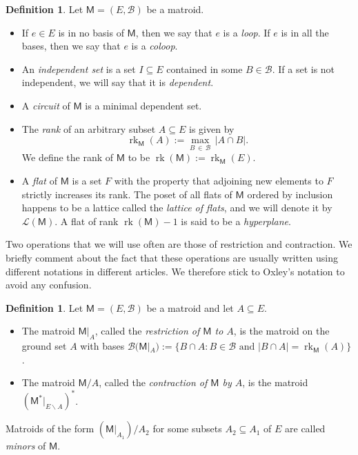 \documentclass[11pt, a4paper, english]{amsart}
\theoremstyle{teoremas}
\theoremstyle{definition}
\newtheorem{definition}[theorem]{Definition}
\DeclareMathOperator{\rk}{rk}
\newcommand{\M}{\mathsf{M}}
\begin{document}
\begin{definition}
    Let $\M=(E,\mathscr{B})$ be a matroid.
    \begin{itemize}
        \item If $e\in E$ is in no basis of $\M$, then we say that $e$ is a \emph{loop}. If $e$ is in all the bases, then we say that $e$ is a \emph{coloop}.
        \item An \emph{independent set} is a set $I\subseteq E$ contained in some $B\in \mathscr{B}$. If a set is not independent, we will say that it is \emph{dependent}.
        \item A \emph{circuit} of $\M$ is a minimal dependent set. 
        \item The \emph{rank} of an arbitrary subset $A\subseteq E$ is given by
            \[ \rk_{\M}(A) := \max_{B\, \in \,\mathscr{B}}\, |A\cap B|.\]
        We define the rank of $\M$ to be $\rk(\M) := \rk_{\M}(E)$.
        \item A \emph{flat} of $\M$ is a set $F$ with the property that adjoining new elements to $F$ strictly increases its rank. The poset of all flats of $\M$ ordered by inclusion happens to be a lattice called the \emph{lattice of flats}, and we will  denote it by $\mathcal{L}(\M)$. A flat of rank $\rk(\M)-1$ is said to be a \emph{hyperplane}.
    \end{itemize}
\end{definition}

Two operations that we will use often are those of restriction and contraction. We briefly comment about the fact that these operations are usually written using different notations in different articles. We therefore stick to Oxley's notation \cite{oxley} to avoid any confusion. 

\begin{definition}
    Let $\M=(E,\mathscr{B})$ be a matroid and let $A\subseteq E$.
    \begin{itemize}
    \item The matroid $\M|_A$, called the \emph{restriction of $\M$ to $A$}, is the matroid on the ground set $A$ with bases $\mathscr{B}(\M|_A) := \{B\cap A: B\in \mathscr{B} \text{ and } |B\cap A| = \rk_{\M}(A)\}$.
    \item The matroid $\M/A$, called the \emph{contraction of $\M$ by $A$}, is the matroid $(\M^*|_{E\smallsetminus A})^*$.
    \end{itemize}
    Matroids of the form $(\M|_{A_1})/{A_2}$ for some subsets $A_2\subseteq A_1$ of $E$ are called \emph{minors} of $\M$.
\end{definition}
\end{document}
